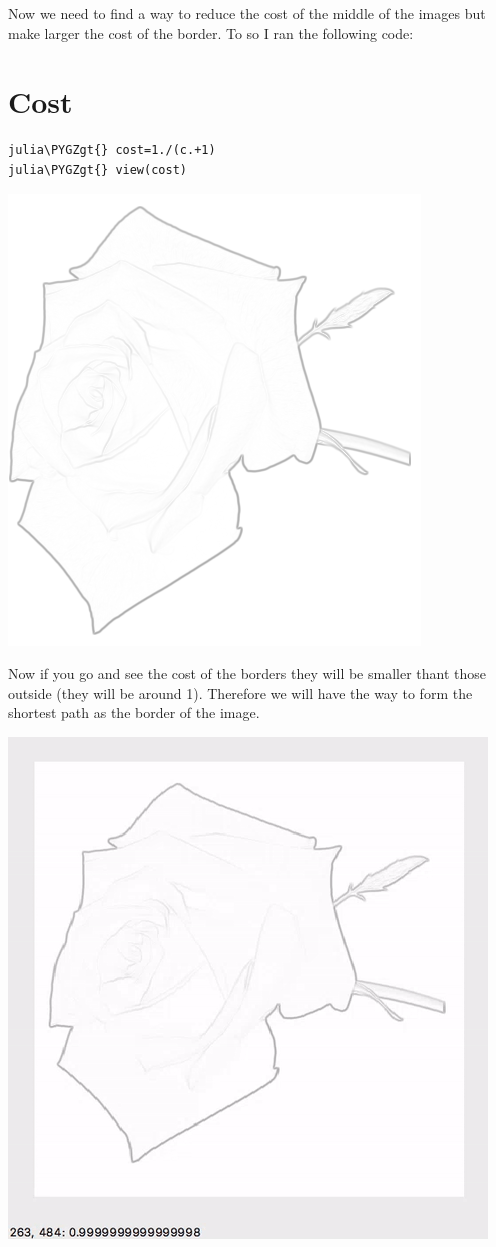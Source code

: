 \documentclass[letterpaper,10pt,english]{sphinxmanual}
\def\PYGZgt{\char`\>}
\begin{document}
Now we need to find a way to reduce the cost of the middle of the images but make larger the cost of the border. To so I ran the following code:


\section{Cost}
\label{Images:cost}
\begin{Verbatim}[commandchars=\\\{\}]
julia\PYGZgt{} cost=1./(c.+1)
julia\PYGZgt{} view(cost)
\end{Verbatim}

\includegraphics{cost.png}

Now if you go and see the cost of the borders they will be smaller thant those outside (they will be around 1). Therefore we will have the way to form the shortest path as the border of the image.

\includegraphics{costvi.gif}
\end{document}
